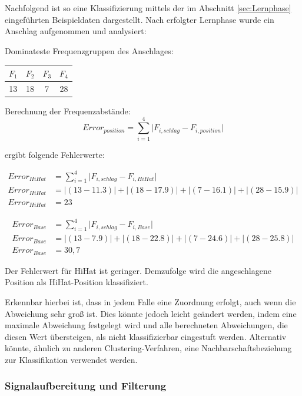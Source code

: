 Nachfolgend ist so eine Klassifizierung mittels der im Abschnitt \ref{sec:Lernphase} eingeführten Beispieldaten dargestellt.
Nach erfolgter Lernphase wurde ein Anschlag aufgenommen und analysiert:

Dominateste Frequenzgruppen des Anschlages: 
\begin{tabular}{c c c c}
$F_1$ & $F_2$ & $F_3$ & $F_4$\\
\hline
 13  &	18 &	7 &	28\\
\end{tabular}

Berechnung der Frequenzabstände:
\begin{displaymath}
Error_{position} = \sum_{i=1}^{4} \lvert F_{i,schlag} - F_{i,position}\rvert
\end{displaymath}

ergibt folgende Fehlerwerte:


\begin{align*}
Error_{HiHat} &= \sum_{i=1}^{4}  \lvert F_{i,schlag} - F_{i,HiHat}\rvert \\
Error_{HiHat} &= \lvert(13-11.3)\rvert + \lvert(18-17.9)\rvert + \lvert(7-16.1)\rvert + \lvert(28-15.9)\rvert \\
Error_{HiHat} &= 23
\end{align*}


\begin{align*}
Error_{Base} &= \sum_{i=1}^{4} \lvert F_{i,schlag} - F_{i,Base}\rvert \\
Error_{Base} &= \lvert (13-7.9)\rvert + \lvert(18-22.8)\rvert + \lvert(7-24.6)\rvert + \lvert(28-25.8)\rvert \\
Error_{Base} &= 30,7
\end{align*}

Der Fehlerwert für HiHat ist geringer.
Demzufolge wird die angeschlagene Position als HiHat-Position klassifiziert.
 
Erkennbar hierbei ist, dass in jedem Falle eine Zuordnung erfolgt, auch wenn die Abweichung sehr groß ist. 
Dies könnte jedoch leicht geändert werden, indem eine maximale Abweichung festgelegt wird und alle berechneten Abweichungen, die diesen Wert übersteigen, als nicht klassifizierbar eingestuft werden. 
Alternativ könnte, ähnlich zu anderen Clustering-Verfahren, eine Nachbarschaftsbeziehung zur Klassifikation verwendet werden.

\subsubsection{Signalaufbereitung und Filterung}

